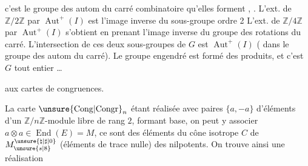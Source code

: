 c'est le groupe des autom du carré combinatoire
 qu'elles forment
, . L'ext. de $\mathbb Z/2\mathbb Z$ par $\operatorname{Aut}^+(I)$
est l'image inverse du sous-groupe 
ordre 2 
L'ext. de $\mathbb Z/4\mathbb Z$ par $\operatorname{Aut}^+(I)$ s'obtient en prenant
l'image inverse du groupe des rotations
du carré. L'intersection de ces deux
sous-groupes de $G$ est $\operatorname{Aut}^+(I)$
( dans le groupe des autom du
carré). Le groupe engendré est formé
des produits, et c'est $G$ tout entier \ldots

 aux cartes de congruences.

La carte $\unsure{\mathrm{Cong}|\mathrm{Congr}}_{n}$ étant réalisée avec 
 paires $\{a,-a\}$
d'éléments d'un $\mathbb Z/n\mathbb Z$-module libre  de
rang $2$, formant base, on peut y
associer $a\otimes a\in\operatorname{End}(E)=M$,  ce sont
des éléments du cône isotrope $C$ de $M^{\unsure{\natural|\sharp|0}}_{\unsure{s|8}}$
(éléments de trace nulle)   des
nilpotents. On trouve ainsi une réalisation
